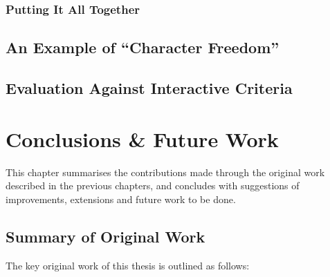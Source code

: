 \documentclass[11pt]{report}
\begin{document}
\subsection{Putting It All Together}

\section{An Example of ``Character Freedom''}
\label{sec:freedom-example}

\section{Evaluation Against Interactive Criteria}
\label{sec:criteria-evaluation}

\chapter{Conclusions \& Future Work}
\label{cha:conclusions}

This chapter summarises the contributions made through the original work described
in the previous chapters, and concludes with suggestions of improvements,
extensions and future work to be done.

\section{Summary of Original Work}

The key original work of this thesis is outlined as follows:
\end{document}
